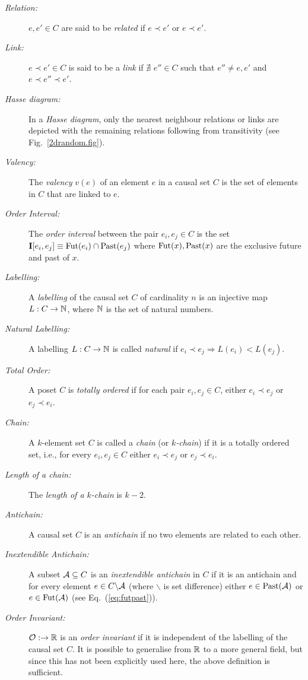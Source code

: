   \begin{description}
     \item[\textit{Relation:}] $e,e' \in C$ are said to be \emph{related} if $e \prec e'$ or   $e \prec e'$. 
     \item[\textit{Link:}]  $e \prec e' \in C$ is said to be  a \emph{link} if  $\nexists \, \, e''\in C$ such
      that $e''\neq e,e'$ and $e\prec e''\prec e'$. 
     \item[\textit{Hasse diagram:}] In a \emph{Hasse diagram}, only the nearest neighbour relations or {links} are depicted with the remaining relations following from
 transitivity (see Fig.~\ref{2drandom.fig}). 
     \item[\textit{Valency:}] The \emph{valency} $v(e)$ of an element $e$ in a causal set $C$ is the set of elements in $C$
   that are linked to $e$. 
     \item[\textit{Order Interval:}]  The \emph{order interval} between the pair $e_i, e_j \in C$  is the set $\mathbf I[e_i,e_j]
   \equiv \mathrm{Fut}(e_i) \cap \mathrm{Past}(e_j)$ where $\mathrm{Fut}(x), \mathrm{Past}(x)$ are the exclusive future and past of $x$.  
     \item[\textit{Labelling:}] A \emph{labelling} of the causal set $C$ of cardinality $n$  is an injective  map $L:C   \rightarrow  \mathbb N$,
    where $\mathbb N$ is the set of natural numbers.  
     \item[\textit{Natural Labelling:}] A labelling  $L:C   \rightarrow  \mathbb N $ is called \emph{natural}
      if $e_i \prec e_j \Rightarrow L(e_i) < L(e_j)$.
     \item[\textit{Total Order:}] A poset $C$ is \emph{totally ordered}  if for each pair $e_i, e_j \in C$, either $e_i \prec
   e_j$ or $e_j \prec e_i$.     
     \item[\textit{Chain:}] A $k$-element set  $C$ is called a \emph{chain} (or \emph{$k$-chain}) if it is a totally ordered
       set, i.e., for every $e_i,e_j \in C$ either $e_i \prec e_j $ or $e_j \prec e_i$.    
     \item[\textit{Length of a chain:}] The \emph{length of a $k$-chain} is  $k-2$.
       
     \item[\textit{Antichain:}] A causal set $C$ is an  \emph{antichain} if no two elements are related to
       each other.
       
     \item[\textit{Inextendible Antichain:}] A subset  $\mathcal A \subseteq  C$ is  an  \emph{inextendible antichain} in $C$
       if it is an antichain and for every 
        element $e \in C \backslash\mathcal A$  (where $\backslash$ is set difference)  either $e \in \mathrm{Past}(\mathcal A)$ or $e\in \mathrm{Fut}(\mathcal A)$ (see Eq.~(\ref{eq:futpast})).
     \item[\textit{Order Invariant:}] $\mathcal O: \rightarrow \mathbb R$ is an \emph{order invariant}  if it is independent of the
        labelling of the causal set $C$. It is possible to generalise from $\mathbb R $ to a  more general field, but since this has not been
        explicitly used here, the above definition is sufficient.
        

\end{description}
